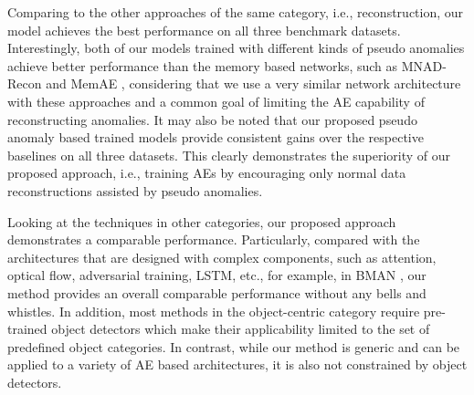 \documentclass{bmvc2k}
\begin{document}
Comparing to the other approaches of the same category, i.e., reconstruction, our model achieves the best performance on all three benchmark datasets. Interestingly, both of our models trained with different kinds of pseudo anomalies achieve better performance than the memory based networks, such as MNAD-Recon \cite{park2020learning} and MemAE \cite{gong2019memorizing}, considering that we use a very similar network architecture with these approaches and a common goal of limiting the AE capability of reconstructing anomalies. It may also be noted that our proposed pseudo anomaly based trained models provide consistent gains over the respective baselines on all three datasets. 
This clearly demonstrates the superiority of our proposed approach, i.e., training AEs by encouraging only normal data reconstructions assisted by pseudo anomalies. 

Looking at the techniques in other categories, our proposed approach demonstrates a comparable performance.
Particularly, compared with the architectures that are designed with complex components, such as attention, optical flow, adversarial training, LSTM, etc., for example, in BMAN \cite{lee2019bman}, our method provides an overall comparable performance without any bells and whistles. In addition, most methods in the object-centric category \cite{ionescu2019object,doshi2020any,doshi2020continual,sun2020scene,yu2020cloze,georgescu2021background} require pre-trained object detectors which make their applicability limited to the set of predefined object categories. 
In contrast, while our method is generic and can be applied to a variety of AE based architectures, it is also not constrained by object detectors.
\end{document}
